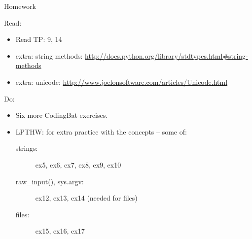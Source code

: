 \documentclass{beamer}
\begin{document}
\begin{frame}[fragile]{Homework}

Read:
\begin{itemize}
  \item Read TP: 9, 14
  \item extra: string methods: \url{http://docs.python.org/library/stdtypes.html#string-methods}
  \item extra: unicode: \url{http://www.joelonsoftware.com/articles/Unicode.html}
\end{itemize}

Do:
\begin{itemize}
    \item Six more CodingBat exercises. 
    \item LPTHW: for extra practice with the concepts -- some of:
    \begin{description}
        \item[strings:] ex5, ex6, ex7, ex8, ex9, ex10
        \item[raw\_input(), sys.argv:] ex12, ex13, ex14 (needed for files)
        \item[files:] ex15, ex16, ex17 
    \end{description}    
\end{itemize}

\end{frame}
\end{document}
